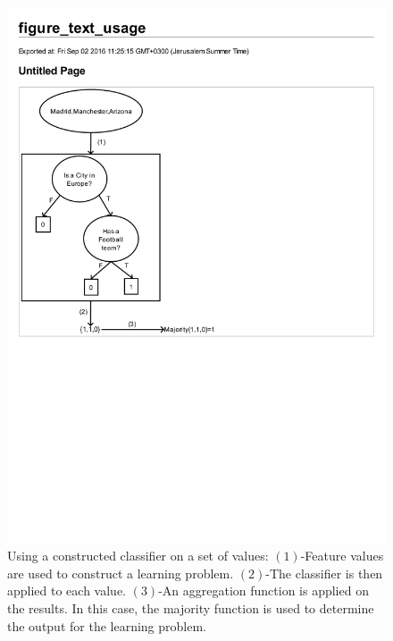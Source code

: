 \documentclass[twoside,11pt]{article}
\theoremstyle{definition}
\begin{document}
\begin{figure}[t]
	\centering
	\includegraphics[scale=0.8]{fig6.pdf}
	\caption{Using a constructed classifier on a set of values: $(1)$-Feature values are used to construct a learning problem. $(2)$-The classifier is then applied to each value. $(3)$-An aggregation function is applied on the results. In this case, the majority function is used to determine the output for the learning problem.}
	\label{figure5}
\end{figure}
\end{document}
